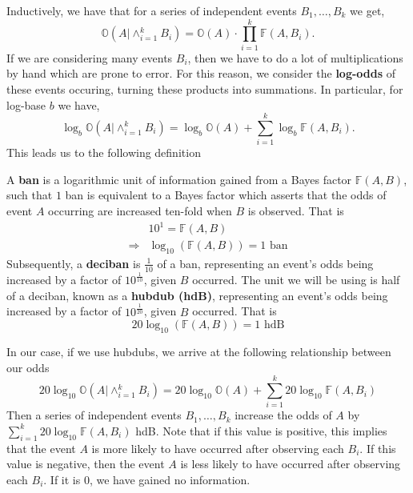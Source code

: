\noindent Inductively, we have that for a series of independent
events $B_1, \dots, B_k$ we get,
\[
  \mathbb{O}(A|\wedge_{i=1}^k B_i) =
  \mathbb{O}(A)\cdot\prod_{i=1}^k{\mathbb{F}(A,B_i)}.
\]
If we are considering many events $B_i$, then we have to do a lot
of multiplications by hand which are prone to error. For this
reason, we consider the {\bf{log-odds}} of these events occuring,
turning these products into summations. In particular, for log-base $b$ we have,
\[
  \log_b\mathbb{O}(A|\wedge_{i=1}^k B_i) =
  \log_b\mathbb{O}(A)+\sum_{i=1}^k{\log_b\mathbb{F}(A,B_i)}.
\]
This leads us to the following definition
\begin{definition}
  A {\bf{ban}} is a logarithmic unit of information gained from a
  Bayes factor $\mathbb{F}(A,B)$, such that $1$ ban is equivalent to
  a Bayes factor which asserts that the odds of event $A$
  occurring are increased ten-fold when $B$ is observed. That is
  \begin{align*}
    & 10^1 = \mathbb{F}(A,B)                    \\
    \Rightarrow & \log_{10}(\mathbb{F}(A,B)) = 1\text{ ban}
  \end{align*}
  \noindent Subsequently, a {\bf{deciban}} is $\frac{1}{10}$ of a
  ban, representing an event's odds being increased by a factor of
  $10^\frac{1}{10}$, given $B$ occurred. The unit we will be using
  is half of a deciban, known as a {\bf{hubdub (hdB)}},
  representing an event's odds being increased by a factor of
  $10^\frac{1}{20}$, given $B$ occurred. That is
  \[
    20\log_{10}(\mathbb{F}(A,B)) = 1\text{ hdB}
  \]
\end{definition}
\noindent In our case, if we use hubdubs, we arrive at the
following relationship between our odds
\[
  20\log_{10}\mathbb{O}(A|\wedge_{i=1}^k B_i) =
  20\log_{10}\mathbb{O}(A)+\sum_{i=1}^k{20\log_{10}\mathbb{F}(A,B_i)}
\]
Then a series of independent events $B_1, \dots, B_k$ increase the
odds of $A$ by  $\sum_{i=1}^k{20\log_{10}\mathbb{F}(A,B_i)}$ hdB.
Note that if this value is positive, this implies that the event $A$
is more likely to have occurred after observing each $B_i$. If this
value is negative, then the event $A$ is less likely to have
occurred after observing each $B_i$. If it is $0$, we have gained no
information.

